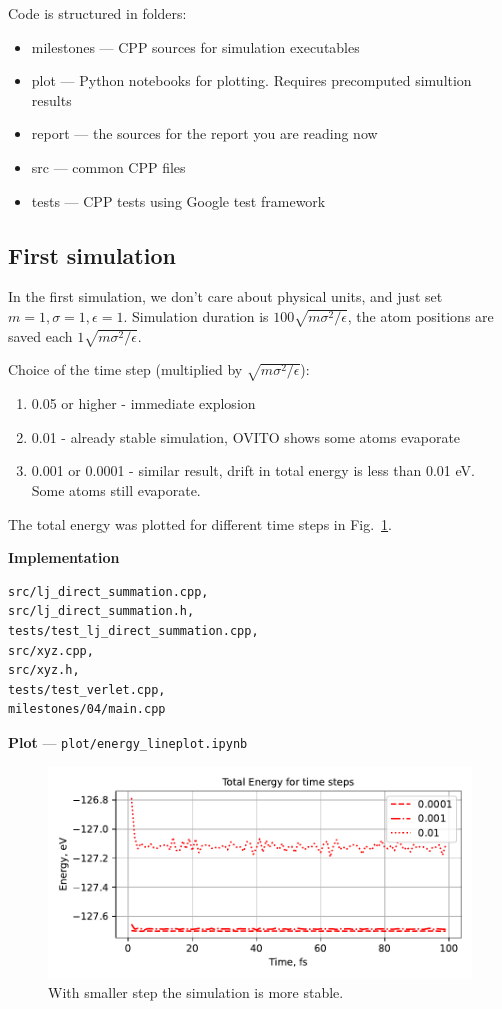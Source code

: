 \documentclass[12pt,a4paper]{article}
\begin{document}
Code is structured in folders:
\begin{itemize}
	\item milestones --- CPP sources for simulation executables
	\item plot --- Python notebooks for plotting. Requires precomputed simultion results
	\item report --- the sources for the report you are reading now
	\item src --- common CPP files
	\item tests --- CPP tests using Google test framework
\end{itemize}

\subsection*{First simulation}
In the first simulation, we don't care about physical units, and just set \( m=1, \sigma=1, \epsilon=1 \). Simulation duration is \( 100 \sqrt{m\sigma^2 / \epsilon} \), the atom positions are saved each \( 1 \sqrt{m\sigma^2 / \epsilon} \).  

Choice of the time step (multiplied by \( \sqrt{m\sigma^2 / \epsilon} \)):

\begin{enumerate}
	\item 0.05 or higher - immediate explosion
	\item 0.01 - already stable simulation, OVITO shows some atoms evaporate
	\item 0.001 or 0.0001 - similar result, drift in total energy is less than 0.01 eV. Some atoms still evaporate.
\end{enumerate}

The total energy was plotted for different time steps in Fig.~\ref{fig:first_simulation}.

{\bf Implementation}
\begin{lstlisting}[breaklines]
src/lj_direct_summation.cpp, 
src/lj_direct_summation.h,
tests/test_lj_direct_summation.cpp,
src/xyz.cpp,
src/xyz.h,
tests/test_verlet.cpp,
milestones/04/main.cpp
\end{lstlisting}


{\bf Plot} --- \verb|plot/energy_lineplot.ipynb|

\begin{figure}[htb]
	\centering
	\includegraphics[width=.7\linewidth]{img/milestone04-total.pdf}
	\caption{With smaller step the simulation is more stable.}
	\label{fig:first_simulation}
\end{figure}
\end{document}
